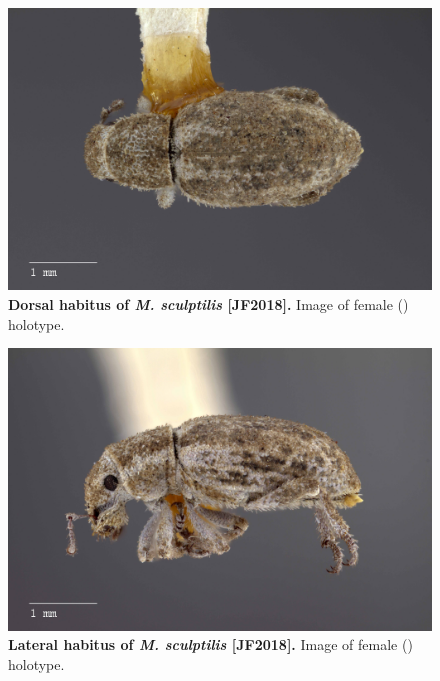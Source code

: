 \documentclass[fleqn,10pt,lineno]{wlpeerj} %
\begin{document}
\begin{figure}[h]
	\begin{sideways}
		\centering
		\includegraphics[height=\textwidth]{figure16.jpg}
	\end{sideways}
	\caption{\textbf{Dorsal habitus of \textit{M. sculptilis} [JF2018].} Image of female (\female) holotype.}
	\label{fig:sculptilis_F_dorsal}
\end{figure}

\begin{figure}[h]
	\begin{sideways}
		\centering
		\includegraphics[height=\textwidth]{figure17.jpg}
	\end{sideways}
	\caption{\textbf{Lateral habitus of \textit{M. sculptilis} [JF2018].} Image of female (\female) holotype.}
	\label{fig:sculptilis_F_lateral}
\end{figure}
\end{document}
